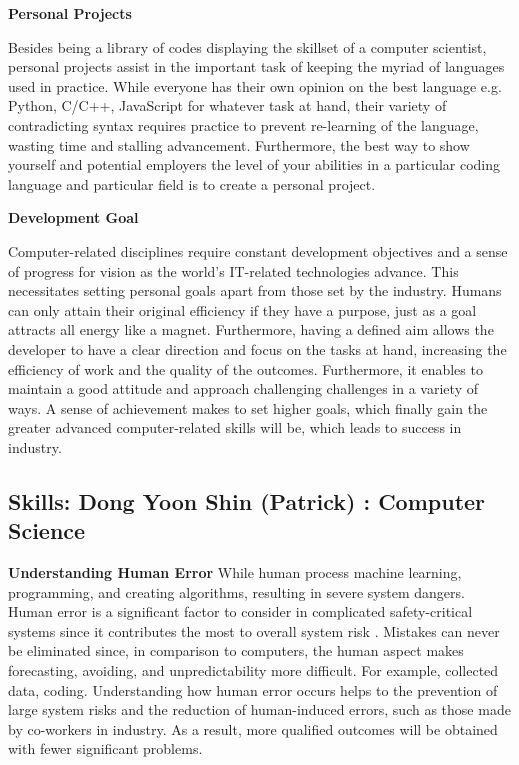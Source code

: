 \documentclass[a4paper, 11pt]{report}
\begin{document}
\textbf{Personal Projects}

Besides being a library of codes displaying the skillset of a computer scientist, personal projects assist in the important task of keeping the myriad of languages used in practice. While everyone has their own opinion on the best language e.g. Python, C/C++, JavaScript for whatever task at hand, their variety of contradicting syntax requires practice to prevent re-learning of the language, wasting time and stalling advancement. Furthermore, the best way to show yourself and potential employers the level of your abilities in a particular coding language and particular field is to create a personal project.

\textbf{Development Goal}

  Computer-related disciplines require constant development objectives and a sense of progress for vision as the world's IT-related technologies advance. This necessitates setting personal goals apart from those set by the industry. Humans can only attain their original efficiency if they have a purpose, just as a goal attracts all energy like a magnet. Furthermore, having a defined aim allows the developer to have a clear direction and focus on the tasks at hand, increasing the efficiency of work and the quality of the outcomes. Furthermore, it enables to maintain a good attitude and approach challenging challenges in a variety of ways. A sense of achievement makes to set higher goals, which finally gain the greater advanced computer-related skills will be, which leads to success in industry.



\subsection{Skills: Dong Yoon Shin (Patrick) : Computer Science}

\textbf{Understanding Human Error}
  While human process machine learning, programming, and creating algorithms, resulting in severe system dangers. Human error is a significant factor to consider in complicated safety-critical systems since it contributes the most to overall system risk \cite{hum}. Mistakes can never be eliminated since, in comparison to computers, the human aspect makes forecasting, avoiding, and unpredictability more difficult. For example, collected data, coding. Understanding how human error occurs helps to the prevention of large system risks and the reduction of human-induced errors, such as those made by co-workers in industry. As a result, more qualified outcomes will be obtained with fewer significant problems.
\end{document}
